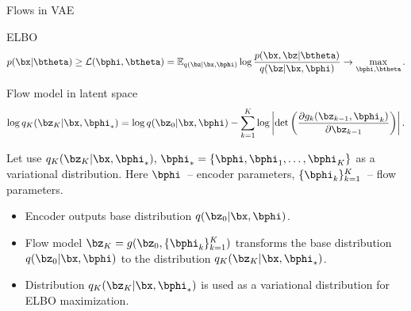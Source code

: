 \begin{frame}{Flows in VAE}
	\begin{block}{ELBO}
		\vspace{-0.3cm}
		\[
			p(\bx | \btheta) \geq \mathcal{L} (\bphi, \btheta)  = \mathbb{E}_{q(\bz | \bx, \bphi)} \log \frac{p(\bx, \bz | \btheta)}{q(\bz| \bx, \bphi)} \rightarrow \max_{\bphi, \btheta}.
		\]
		\vspace{-0.5cm}
	\end{block}
	\begin{block}{Flow model in latent space}
		\vspace{-0.7cm}
		\[
			\log q_K(\bz_K | \bx, \bphi_*) = \log q(\bz_0 | \bx, \bphi) - \sum_{k=1}^K \log \left| \det \left( \frac{\partial g_k(\bz_{k - 1}, \bphi_k)}{\partial \bz_{k-1}} \right) \right|.
		\]
		\vspace{-0.5cm}
	\end{block}
	Let use $q_K(\bz_K | \bx, \bphi_*), \, \bphi_* = \{\bphi, \bphi_1, \dots, \bphi_K\}$ as a variational distribution. Here $\bphi$~-- encoder parameters, $\{\bphi_k\}_{k=1}^K$~-- flow parameters.
	
	\begin{itemize}
		\item Encoder outputs base distribution $q(\bz_0 | \bx, \bphi)$.
		\item Flow model $\bz_K = g(\bz_0, \{\bphi_k\}_{k=1}^K)$ transforms the base distribution $q(\bz_0 | \bx, \bphi)$ to the distribution $q_K(\bz_K | \bx, \bphi_*)$.
		\item Distribution $q_K(\bz_K | \bx, \bphi_*)$ is used as a variational distribution for ELBO maximization.
	\end{itemize}
	
\end{frame}
